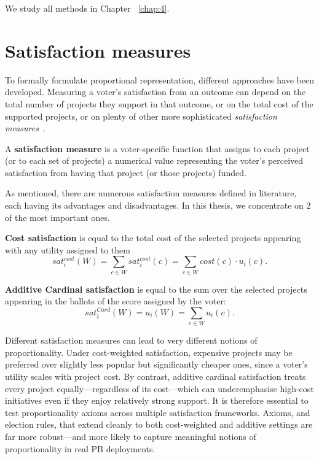 We study all methods in Chapter ~\ref{chap:4}.
\section{Satisfaction measures}
To formally formulate proportional representation, different approaches have been developed. Measuring a voter's satisfaction from an outcome can depend on the total number of projects they support in that outcome, or on the total cost of the supported projects, or on plenty of other more sophisticated \emph{satisfaction measures}~\cite{BrillForster2023}.
\begin{definition}
A \textbf{satisfaction measure} is a voter‐specific function that assigns to each project (or to each set of projects) a numerical value representing the voter’s perceived satisfaction from having that project (or those projects) funded.
\end{definition}
As mentioned, there are numerous satisfaction measures defined in literature, each having its advantages and disadvantages. In this thesis, we concentrate on $2$ of the most important ones.
\begin{definition}
\textbf{Cost satisfaction} is equal to the total cost of the selected projects appearing with any utility assigned to them
$$
sat_i^{cost}(W)=\sum_{c\in W}sat_i^{cost}(c)=\sum_{c\in W}cost(c)\cdot u_i(c).
$$
\end{definition}
\begin{definition}
\textbf{Additive Cardinal satisfaction} is equal to the sum over the selected projects appearing in the ballots of the score assigned by the voter: 
$$
sat_i^{Card}(W)=u_i(W)=\sum_{c\in W}u_i(c).
$$
\end{definition}
Different satisfaction measures can lead to very different notions of proportionality. Under cost-weighted satisfaction, expensive projects may be preferred over slightly less popular but significantly cheaper ones, since a voter’s utility scales with project cost. By contrast, additive cardinal satisfaction treats every project equally—regardless of its cost—which can underemphasise high-cost initiatives even if they enjoy relatively strong support. It is therefore essential to test proportionality axioms across multiple satisfaction frameworks. Axioms, and election rules, that extend cleanly to both cost-weighted and additive settings are far more robust—and more likely to capture meaningful notions of proportionality in real PB deployments.
